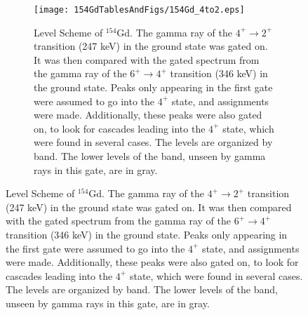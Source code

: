 \begin{landscape}
\begin{figure}[!]
    \centering
    \begin{subfigure}{1.4\textwidth}
    \texttt{[image: 154GdTablesAndFigs/154Gd\_4to2.eps]}
    \caption{\label{fig:154_4to2level}Level Scheme of $^{154}$Gd. The gamma ray of the $4^+\rightarrow2^+$ transition (247 keV) in the ground state was gated on. It was then compared with the gated spectrum from the gamma ray of the $6^+\rightarrow4^+$ transition (346 keV) in the ground state. Peaks only appearing in the first gate were assumed to go into the $4^+$ state, and assignments were made. Additionally, these peaks were also gated on, to look for cascades leading into the $4^+$ state, which were found in several cases. The levels are organized by band. The lower levels of the band, unseen by gamma rays in this gate, are in gray.}
    \end{subfigure}
    \label{fig:154_4to2}
    \end{figure}
    \end{landscape}
